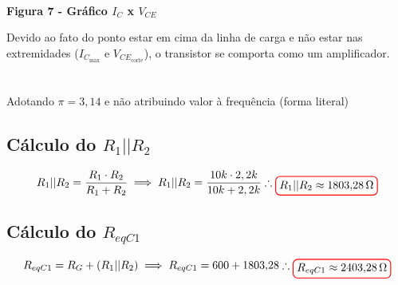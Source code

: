 \documentclass[12pt,openany,oneside,a4paper]{abntex2}
\begin{document}
\begin{center}

    \\  %

    \large \textbf{Figura 7 - Gráfico $I_C$ x $V_{CE}$}
\end{center} Devido ao fato do ponto estar em cima da linha de carga e não estar nas extremidades ($I_{C_{\text{máx}}}$ e $V_{CE_{\text{corte}}}$), o transistor se comporta como um amplificador.

\section{}
Adotando $\pi = 3,14$ e não atribuindo valor à frequência (forma literal)

\subsection{Cálculo do $R_{1} || R_{2}$}
\[
R_{1} || R_{2} = \frac{R_{1} \cdot R_{2}}{R_{1} + R_{2}} \implies R_{1} || R_{2} = \frac{10k \cdot 2,2k}{10k + 2,2k} \therefore \tikz[baseline]{\node[draw=red, thick, rounded corners] {$R_{1} || R_{2} \approx 1803{,}28\,\Omega$};}
\]

\subsection{Cálculo do $R_{eqC1}$}
\[
R_{eqC1} = R_{G} + (R_{1} || R_{2}) \implies R_{eqC1} = 600 + 1803{,}28 \therefore \tikz[baseline]{\node[draw=red, thick, rounded corners] {$R_{eqC1} \approx 2403{,}28\,\Omega$};}
\]
\end{document}
